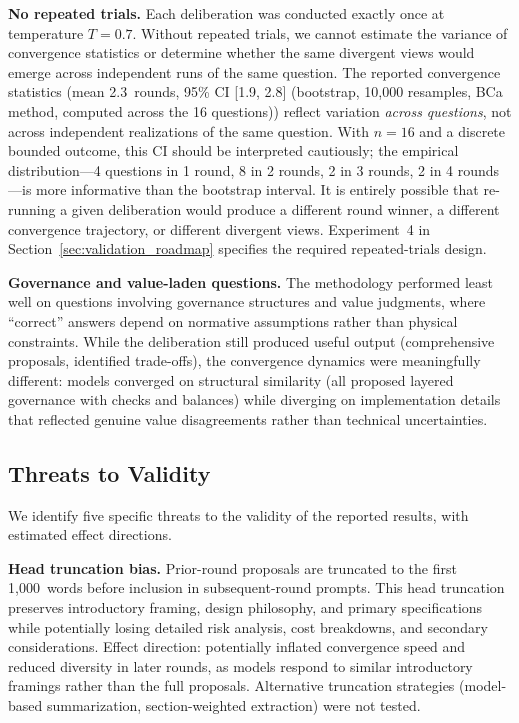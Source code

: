 \documentclass[11pt,a4paper]{article}
\begin{document}
\textbf{No repeated trials.} Each deliberation was conducted exactly once at temperature $T = 0.7$. Without repeated trials, we cannot estimate the variance of convergence statistics or determine whether the same divergent views would emerge across independent runs of the same question. The reported convergence statistics (mean 2.3~rounds, 95\% CI [1.9, 2.8] (bootstrap, 10,000 resamples, BCa method, computed across the 16 questions)) reflect variation \emph{across questions}, not across independent realizations of the same question. With $n=16$ and a discrete bounded outcome, this CI should be interpreted cautiously; the empirical distribution---4 questions in 1 round, 8 in 2 rounds, 2 in 3 rounds, 2 in 4 rounds---is more informative than the bootstrap interval. It is entirely possible that re-running a given deliberation would produce a different round winner, a different convergence trajectory, or different divergent views. Experiment~4 in Section~\ref{sec:validation_roadmap} specifies the required repeated-trials design.

\textbf{Governance and value-laden questions.} The methodology performed least well on questions involving governance structures and value judgments, where ``correct'' answers depend on normative assumptions rather than physical constraints. While the deliberation still produced useful output (comprehensive proposals, identified trade-offs), the convergence dynamics were meaningfully different: models converged on structural similarity (all proposed layered governance with checks and balances) while diverging on implementation details that reflected genuine value disagreements rather than technical uncertainties.

\subsection{Threats to Validity}
\label{sec:threats}

We identify five specific threats to the validity of the reported results, with estimated effect directions.

\textbf{Head truncation bias.} Prior-round proposals are truncated to the first 1{,}000~words before inclusion in subsequent-round prompts. This head truncation preserves introductory framing, design philosophy, and primary specifications while potentially losing detailed risk analysis, cost breakdowns, and secondary considerations. Effect direction: potentially inflated convergence speed and reduced diversity in later rounds, as models respond to similar introductory framings rather than the full proposals. Alternative truncation strategies (model-based summarization, section-weighted extraction) were not tested.
\end{document}
